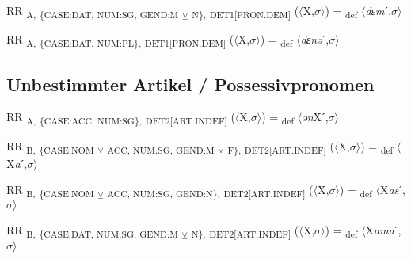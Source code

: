 {\begin{exe}
 RR \textsubscript{A,} \textsubscript{\{CASE:DAT, NUM:SG, GEND:M} \textsubscript{${\veebar}$}\textsubscript{ N\},} \textsubscript{DET1[PRON.DEM]} ($\langle$X,$\sigma $$\rangle$) = \textsubscript{def} $\langle$\textit{dɛm}ˊ,$\sigma $$\rangle$
\end{exe}

\begin{exe}
 RR \textsubscript{A,} \textsubscript{\{CASE:DAT, NUM:PL\},} \textsubscript{DET1[PRON.DEM]} ($\langle$X,$\sigma $$\rangle$) = \textsubscript{def} $\langle$\textit{dɛnə}ˊ,$\sigma $$\rangle$
\end{exe}

\subsection{Unbestimmter Artikel / Possessivpronomen}

\begin{exe}
 RR \textsubscript{A,} \textsubscript{\{CASE:ACC, NUM:SG\},} \textsubscript{DET2[ART.INDEF]} ($\langle$X,$\sigma $$\rangle$) = \textsubscript{def} $\langle$\textit{ən}Xˊ,$\sigma $$\rangle$
\end{exe}

\begin{exe}
 RR \textsubscript{B,} \textsubscript{\{CASE:NOM} \textsubscript{${\veebar}$}\textsubscript{ ACC, NUM:SG, GEND:M} \textsubscript{${\veebar}$}\textsubscript{ F\},} \textsubscript{DET2[ART.INDEF]} ($\langle$X,$\sigma $$\rangle$) = \textsubscript{def} $\langle$X\textit{a}ˊ,$\sigma $$\rangle$
\end{exe}

\begin{exe}
 RR \textsubscript{B,} \textsubscript{\{CASE:NOM} \textsubscript{${\veebar}$}\textsubscript{ ACC, NUM:SG, GEND:N\},} \textsubscript{DET2[ART.INDEF]} ($\langle$X,$\sigma $$\rangle$) = \textsubscript{def} $\langle$X\textit{as}ˊ,$\sigma $$\rangle$
\end{exe}

\begin{exe}
 RR \textsubscript{B,} \textsubscript{\{CASE:DAT, NUM:SG, GEND:M} \textsubscript{${\veebar}$}\textsubscript{ N\},} \textsubscript{DET2[ART.INDEF]} ($\langle$X,$\sigma $$\rangle$) = \textsubscript{def} $\langle$X\textit{ama}ˊ,$\sigma $$\rangle$
\end{exe}

}

